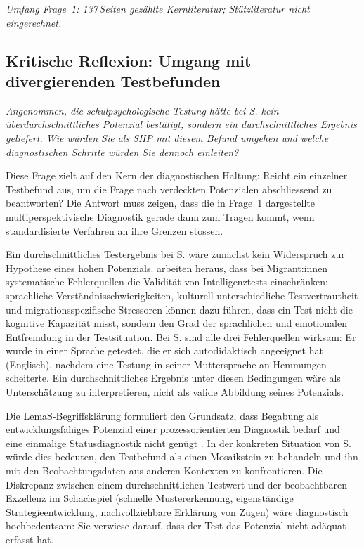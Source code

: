 \documentclass[ngerman, a4paper]{article}
\begin{document}
\textit{Umfang Frage~1: 137\,Seiten gezählte Kernliteratur; Stützliteratur nicht eingerechnet.}




\subsection{Kritische Reflexion: Umgang mit divergierenden Testbefunden}


\begin{tcolorbox}[colback=gray!5, colframe=gray!50, title=Weiterführende Diskurslinie]
  \itshape
  Angenommen, die schulpsychologische Testung hätte bei S. kein überdurchschnittliches
  Potenzial bestätigt, sondern ein durchschnittliches Ergebnis geliefert. Wie würden Sie
  als SHP mit diesem Befund umgehen und welche diagnostischen Schritte würden Sie
  dennoch einleiten?
\end{tcolorbox}

Diese Frage zielt auf den Kern der diagnostischen Haltung: Reicht ein einzelner
Testbefund aus, um die Frage nach verdeckten Potenzialen abschliessend zu beantworten?
Die Antwort muss zeigen, dass die in Frage~1 dargestellte multiperspektivische
Diagnostik gerade dann zum Tragen kommt, wenn standardisierte Verfahren an ihre
Grenzen stossen.

Ein durchschnittliches Testergebnis bei S. wäre zunächst kein Widerspruch zur
Hypothese eines hohen Potenzials. \textcite[Kap.\,1--2]{maehler2018diagnostik}
arbeiten heraus, dass bei
Migrant:innen systematische Fehlerquellen die Validität von Intelligenztests
einschränken: sprachliche Verständnisschwierigkeiten, kulturell unterschiedliche
Testvertrautheit und migrationsspezifische Stressoren können dazu führen, dass ein
Test nicht die kognitive Kapazität misst, sondern den Grad der sprachlichen und
emotionalen Entfremdung in der Testsituation. Bei S. sind alle drei Fehlerquellen
wirksam: Er wurde in einer Sprache getestet, die er sich autodidaktisch angeeignet
hat (Englisch), nachdem eine Testung in seiner Muttersprache an Hemmungen scheiterte.
Ein durchschnittliches Ergebnis unter diesen Bedingungen wäre als Unterschätzung zu
interpretieren, nicht als valide Abbildung seines Potenzials.

Die LemaS-Begriffsklärung formuliert den Grundsatz, dass Begabung als
entwicklungsfähiges Potenzial einer prozessorientierten Diagnostik bedarf und eine
einmalige Statusdiagnostik nicht genügt \parencite{lemas2023begriffsklaerung}. In
der konkreten Situation von S. würde dies bedeuten, den Testbefund als einen
Mosaikstein zu behandeln und ihn mit den Beobachtungsdaten aus anderen Kontexten
zu konfrontieren. Die Diskrepanz zwischen einem durchschnittlichen Testwert und der
beobachtbaren Exzellenz im Schachspiel (schnelle Mustererkennung, eigenständige
Strategieentwicklung, nachvollziehbare Erklärung von Zügen) wäre diagnostisch
hochbedeutsam: Sie verwiese darauf, dass der Test das Potenzial nicht adäquat
erfasst hat.
\end{document}
